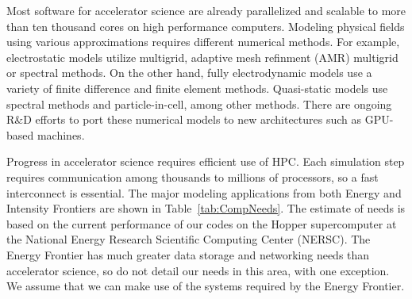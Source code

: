 Most software for accelerator science are already parallelized and scalable to 
more than ten thousand cores on high performance computers. 
Modeling physical fields using various approximations requires different 
numerical methods.  For example, electrostatic models utilize multigrid, 
adaptive mesh refinment (AMR) multigrid or spectral methods.
On the other hand, fully electrodynamic models use a variety of
finite difference and finite element methods.
Quasi-static models use spectral methods and particle-in-cell, among
other methods.
There are ongoing R\&D efforts to port these numerical models to new architectures such as GPU-based machines.

Progress in accelerator science requires efficient use of HPC.
Each simulation step requires communication among thousands to
millions of processors, so a fast interconnect is essential.
The major modeling applications from both Energy and Intensity
Frontiers are shown in Table~\ref{tab:CompNeeds}.  The estimate of needs is
based on the current performance of our codes on the Hopper supercomputer at
the National Energy Research Scientific Computing Center (NERSC). 
The Energy Frontier has much greater data storage and networking needs
than accelerator science, so do not detail our needs in this area, with one
exception.  We assume that we can make use of the systems required by
the Energy Frontier.


